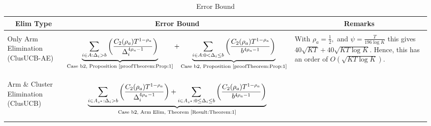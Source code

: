 \begin{table}
\caption{Error Bound}
\label{App:E:table:3}
\begin{center}
\begin{tabular}{p{1.4cm}p{10.3cm}p{3.5cm}}
\multicolumn{1}{c}{\bf Elim Type} &\multicolumn{1}{c}{\bf Error Bound} &\multicolumn{1}{c}{\bf Remarks} \\
\hline \\
Only Arm Elimination (ClusUCB-AE)	& \begin{align*}\underbrace{\sum_{i\in A:\Delta_{i} > b}\bigg(\dfrac{C_{2}(\rho_{a})T^{1-\rho_{a}}}{\Delta_{i}^{4\rho_{a} -1}} \bigg)}_{\text{Case b2, Proposition \ref{proofTheorem:Prop:1}}} + \underbrace{\sum_{i\in A:0 < \Delta_{i}\leq b}\bigg( \dfrac{C_{2}(\rho_{a})T^{1-\rho_{a}}}{b^{4\rho_{a} -1}} \bigg)}_{\text{Case b2, Proposition \ref{proofTheorem:Prop:1}}}\end{align*}  & With $\rho_{a}=\frac{1}{2},$ and $\psi=\frac{T}{196 \log K}$ this gives $40\sqrt{KT}+40\sqrt{KT\log K}$. Hence, this has an order of $O(\sqrt{KT\log K})$.\\
\hline\\
Arm \& Cluster Elimination (ClusUCB) 	& \begin{align*}  \underbrace{\sum_{i\in A_{s^{*}}:\Delta_{i} > b}\bigg(\dfrac{C_{2}(\rho_{a})T^{1-\rho_{a}}}{\Delta_{i}^{4\rho_{a}-1}} \bigg)+ \sum_{i\in A_{s^{*}}:0\leq\Delta_{i}\leq b}\bigg(\dfrac{C_{2}(\rho_{a})T^{1-\rho_{a}}}{b^{4\rho_{a} -1}} \bigg)}_{\text{Case b2, Arm Elim, Theorem \ref{Result:Theorem:1}}}\\   

\end{align*}
\end{tabular}
\end{center}
\end{table}
